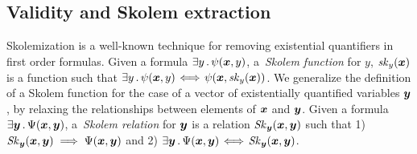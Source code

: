 %




\subsection{Validity and Skolem extraction}
\label{sim:check}

Skolemization  is a well-known
technique for removing existential quantifiers in first order formulas.
%
Given a formula ${ \exists y \such \psi(\vx, y)}$,
a~\emph{Skolem function} for $y$, $\mathit{sk}_{y}(\vx)$ is a function such that
$\exists y \such \psi(\vx,y)\!\iff\!\psi (\vx, \mathit{sk}_{y} (\vx))$.
We generalize the definition of a Skolem function for the case of a
vector of existentially quantified variables $\vy$, by relaxing the
relationships between elements of $\vx$ and $\vy$.
Given a formula ${\exists \vy \such \Psi(\vx, \vy)}$, a~\emph{Skolem relation} for $\vy$ is a relation ${\mathit{Sk}_{\vy} (\vx, \vy)}$ such that 1) $\mathit{Sk}_{\vy} (\vx, \vy) \implies \Psi (\vx, \vy)$ and 2) $\exists \vy \such \Psi(\vx, \vy)\!\iff\!\mathit{Sk}_{\vy} (\vx, \vy)$.
  

